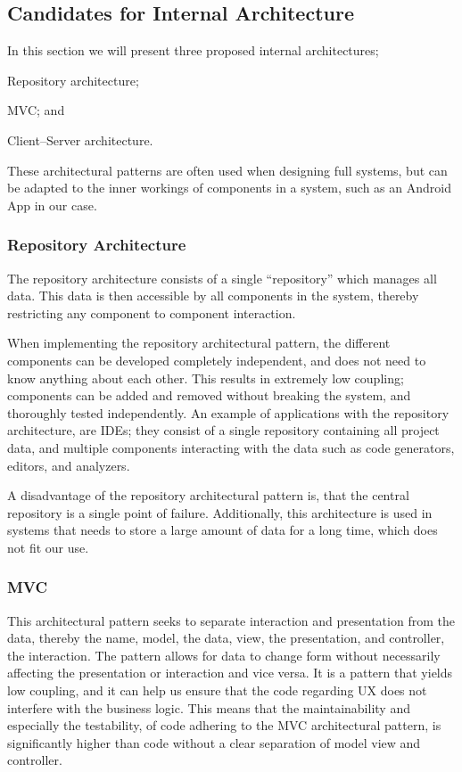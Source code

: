 \subsection{Candidates for Internal Architecture}
In this section we will present three proposed internal architectures;
\begin{eletterate*}
    \item Repository architecture;
    \item \ac{MVC}; and
    \item Client--Server architecture.
\end{eletterate*}
These architectural patterns are often used when designing full systems, but can be adapted to the inner workings of components in a system, such as an Android App in our case.

\subsubsection{Repository Architecture}
The repository architecture consists of a single \enquote{repository} which manages all data.
This data is then accessible by all components in the system, thereby restricting any component to component interaction.

When implementing the repository architectural pattern, the different components can be developed completely independent, and does not need to know anything about each other.
This results in extremely low coupling; components can be added and removed without breaking the system, and thoroughly tested independently.
An example of applications with the repository architecture, are IDEs; they consist of a single repository containing all project data, and multiple components interacting with the data such as code generators, editors, and analyzers.

A disadvantage of the repository architectural pattern is, that the central repository is a single point of failure.
Additionally, this architecture is used in systems that needs to store a large amount of data for a long time, which does not fit our use.

\subsubsection{\acl{MVC}}
This architectural pattern seeks to separate interaction and presentation from the data, thereby the name, model, the data, view, the presentation, and controller, the interaction.
The pattern allows for data to change form without necessarily affecting the presentation or interaction and vice versa.
It is a pattern that yields low coupling, and it can help us ensure that the code regarding \ac{UX} does not interfere with the business logic.
This means that the maintainability and especially the testability, of code adhering to the \ac{MVC} architectural pattern, is significantly higher than code without a clear separation of model view and controller.

